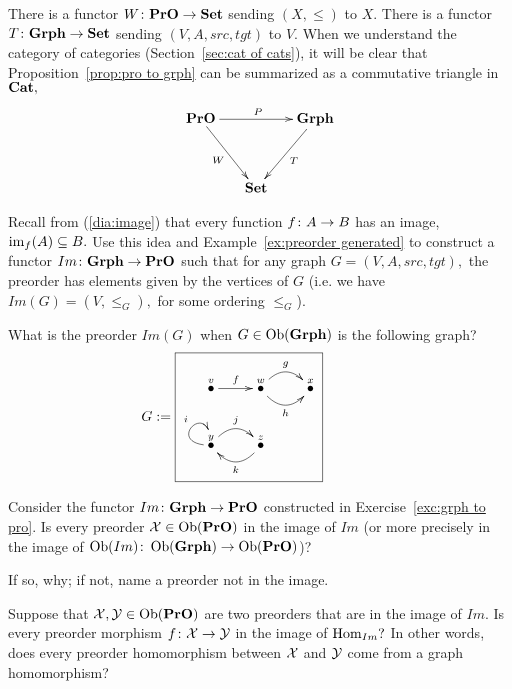 \documentclass[../main/CT4S-EN-RU]{subfiles}
\begin{document}
\begin{exerciseRUS}
\end{exerciseRUS}

\begin{remarkENG}
There is a functor $W\colon{\mathbf{PrO}}\rightarrow{\mathbf{Set}}$ sending $(X,\leq)$ to $X.$ There is a functor $T\colon{\mathbf{Grph}}\rightarrow{\mathbf{Set}}$ sending $(V,A,src,tgt)$ to $V.$ When we understand the category of categories (Section~\ref{sec:cat of cats}), it will be clear that Proposition~\ref{prop:pro to grph} can be summarized as a commutative triangle in ${\mathbf{Cat}},$ 
$$
\xymatrix@=15pt{\PrO\ar[rr]^P\ar[ddr]_W&&\Grph\ar[ddl]^T\\\\&\Set}
$$
\end{remarkENG}

\begin{remarkRUS}
\end{remarkRUS}

\begin{exerciseENG}\label{exc:grph to pro}
Recall from (\ref{dia:image}) that every function $f\colon A\rightarrow B$ has an image, $\operatorname{im}_f(A)\subseteq B.$ Use this idea and Example~\ref{ex:preorder generated} to construct a functor $Im\colon{\mathbf{Grph}}\rightarrow{\mathbf{PrO}}$ such that for any graph $G=(V,A,src,tgt),$ the preorder has elements given by the vertices of $G$ (i.e. we have $Im(G)=(V,\leq_G),$ for some ordering $\leq_G$).
\end{exerciseENG}

\begin{exerciseRUS}\label{exc:grph to pro}
\end{exerciseRUS}

\begin{exerciseENG}
What is the preorder $Im(G)$ when $G\in\operatorname{Ob}({\mathbf{Grph}})$ is the following graph?
$$
G:=\parbox{2in}{\fbox{\xymatrix{\LMO{v}\ar[r]^f&\LMO{w}\ar@/_1pc/[r]_h\ar@/^1pc/[r]^g&\LMO{x}\\\LMO{y}\ar@(l,u)[]^i\ar@/^1pc/[r]^j&\LMO{z}\ar@/^1pc/[l]^k}}}
$$
\end{exerciseENG}

\begin{exerciseRUS}
\end{exerciseRUS}

\begin{exerciseENG}
Consider the functor $Im\colon{\mathbf{Grph}}\rightarrow{\mathbf{PrO}}$ constructed in Exercise~\ref{exc:grph to pro}.
\sexc Is every preorder $\mathcal{X}\in\operatorname{Ob}({\mathbf{PrO}})$ in the image of $Im$ (or more precisely in the image of $\operatorname{Ob}(Im)\colon\operatorname{Ob}({\mathbf{Grph}})\rightarrow\operatorname{Ob}({\mathbf{PrO}})$)?
\item If so, why; if not, name a preorder not in the image.
\item Suppose that $\mathcal{X},\mathcal{Y}\in\operatorname{Ob}({\mathbf{PrO}})$ are two preorders that are in the image of $Im.$ Is every preorder morphism $f\colon\mathcal{X}\rightarrow\mathcal{Y}$ in the image of $\operatorname{Hom}_{Im}?$ In other words, does every preorder homomorphism between $\mathcal{X}$ and $\mathcal{Y}$ come from a graph homomorphism?
\endsexc
\end{exerciseENG}
\end{document}

